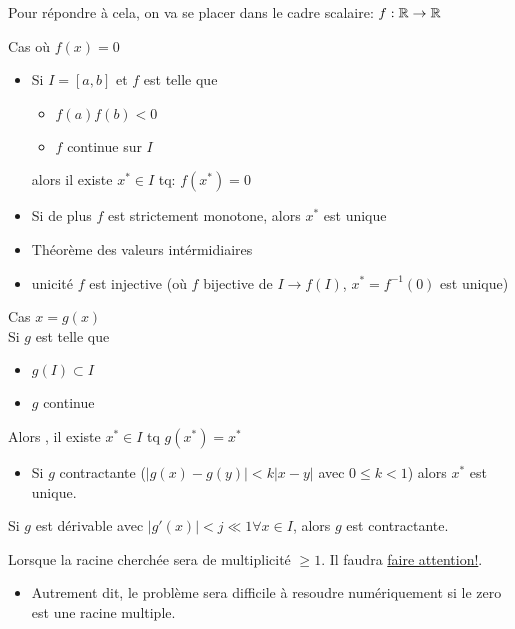 Pour répondre à cela, on va se placer dans le cadre scalaire: $f: \mathbb{R} \to \mathbb{R}$
\begin{prop}
   Cas où $f(x) = 0$
    \begin{itemize}
        \item Si $I = [a, b]$ et  $f$ est telle que 
             \begin{itemize}
                \item $f(a)f(b) < 0$
                \item  $f$ continue sur  $I$
            \end{itemize}
            alors il existe $x^* \in I$ tq: $f(x^*) = 0$
        \item Si de plus  $f$ est strictement monotone, alors  $x^*$ est unique
   \end{itemize}
\end{prop}
\begin{preuve}
   \begin{itemize}
       \item Théorème des valeurs intérmidiaires
       \item unicité $f$ est injective (où $f$ bijective de  $I \to f(I)$, $x^* = f^{-1}(0)$ est unique)
   \end{itemize} 
\end{preuve}
\begin{prop}
   Cas $x = g(x)$ \\
    Si $g$ est telle que 
   \begin{itemize}
       \item  $g(I) \subset I$ 
       \item $g$ continue
   \end{itemize}
   Alors , il existe $x^* \in I$ tq $g(x^*) = x^*$
    \begin{itemize}
       \item Si $g$ contractante  ($|g(x) - g(y)| < k|x - y|$ avec  $0 \le k < 1$) alors $x^*$ est unique.
   \end{itemize}
\end{prop}
\begin{remark}
   Si $g$ est dérivable avec  $|g'(x)| < j \ll 1 \forall x \in I$, alors $g$ est contractante. 
\end{remark}
\begin{remark}
    Lorsque la racine cherchée sera de multiplicité $\ge 1$. Il faudra \underline{faire attention!}. 
    \begin{itemize}
        \item Autrement dit, le problème sera difficile à resoudre numériquement si le zero est une racine multiple.
    \end{itemize}
\end{remark}
